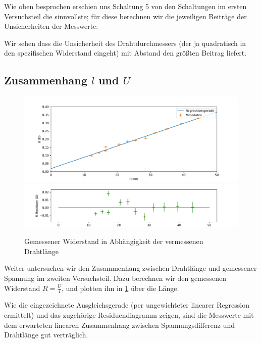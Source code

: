 \documentclass[parskip, 12pt, DIV=16, openany]{scrartcl}
\begin{document}
Wie oben besprochen erschien uns Schaltung 5 von den Schaltungen im ersten Versuchsteil die sinnvollste; für diese berechnen wir die jeweiligen Beiträge der Unsicherheiten der Messwerte:
\begin{center}

\end{center}

Wir sehen dass die Unsicherheit des Drahtdurchmessers (der ja quadratisch in den spezifischen Widerstand eingeht) mit Abstand den größten Beitrag liefert.

\subsection{Zusammenhang $l$ und $U$}

\begin{figure}
\includegraphics[width=\linewidth]{plot1}%
\vspace*{-.9cm}\\
\includegraphics[width=\linewidth]{plot1residuen}
\caption{Gemessener Widerstand in Abhängigkeit der vermessenen Drahtlänge}\label{fig:R}
\end{figure}


Weiter untersuchen wir den Zusammenhang zwischen Drahtlänge und gemessener Spannung im zweiten Versuchsteil. Dazu berechnen wir den gemessenen Widerstand $R = \frac{U}{I}$, und plotten ihn in \cref{fig:R} über die Länge.

Wie die eingezeichnete Ausgleichsgerade (per ungewichteter linearer Regression ermittelt) und das zugehörige Residuendiagramm zeigen, sind die Messwerte mit dem erwarteten linearen Zusammenhang zwischen Spannungsdifferenz und Drahtlänge gut verträglich.
\end{document}
